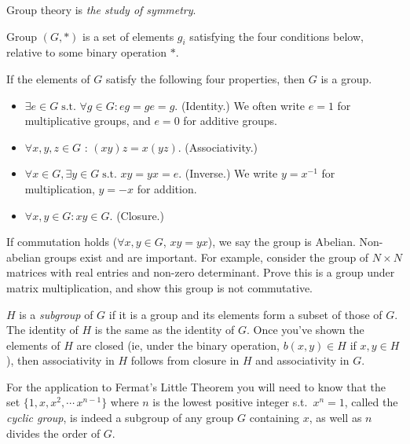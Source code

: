 \documentclass[11pt]{book}
\newcommand\st{\mbox{s.t.\ }}
\begin{document}
Group theory is \emph{the study of symmetry}.


Group $(G, *)$ is a set of elements $g_i$ satisfying the four
conditions below, relative to some binary operation $*$.

If the elements of $G$ satisfy the following four properties, then
$G$ is a group.

\begin{itemize}
\item $\exists e \in G \;\st \forall g \in G : eg = ge = g$. (Identity.)
We often write $e=1$ for multiplicative groups, and $e = 0$ for
additive groups.

\item $\forall x,y,z \in G$ : $(xy)z = x(yz)$. (Associativity.)

\item $\forall x \in G, \exists y \in G \;\st xy = yx = e$. (Inverse.)
We write $y = x^{-1}$ for multiplication, $y = -x$ for addition.

\item $\forall x,y \in G : xy \in G$. (Closure.)
\end{itemize}

If commutation holds ($\forall x, y \in G$, $xy = yx$), we say the
group is Abelian. Non-abelian groups exist and are important. For
example, consider the group of $N \times N$ matrices with real
entries and non-zero determinant. Prove this is a group under
matrix multiplication, and show this group is not commutative.

$H$ is a {\em subgroup} of $G$ if it is a group and its elements
form a subset of those of $G$. The identity of $H$ is the same as
the identity of $G$. Once you've shown the elements of $H$ are
closed (ie, under the binary operation, $b(x,y) \in H$ if $x, y
\in H$), then associativity in $H$ follows from closure in $H$ and
associativity in $G$.

For the application to Fermat's Little Theorem you will need to
know that the set $\{1,x,x^2,\cdots\,x^{n-1}\}$ where $n$ is the
lowest positive integer \st $x^n = 1$, called the {\em cyclic
group}, is indeed a subgroup of any group $G$ containing $x$, as
well as $n$ divides the order of $G$.
\end{document}
